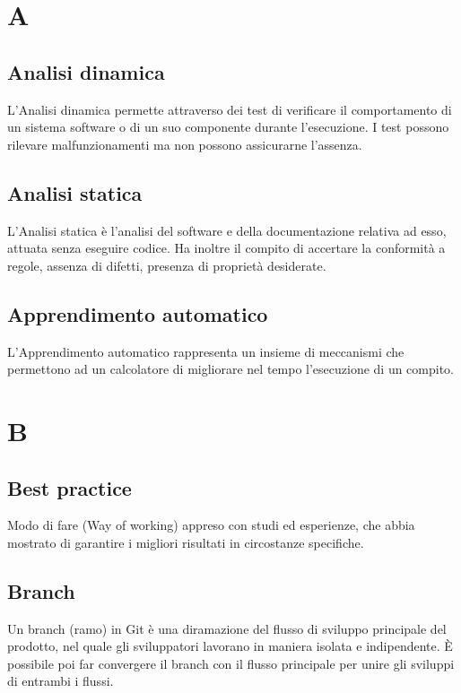 	\section{A}
	\subsection{Analisi dinamica} 
	L'Analisi dinamica permette attraverso dei test di verificare il comportamento di un sistema software o di un suo componente durante l'esecuzione. I test possono rilevare malfunzionamenti ma non possono assicurarne l'assenza.
	
	\subsection{Analisi statica}
	L'Analisi statica è l'analisi del software e della documentazione relativa ad esso, attuata senza eseguire codice. Ha inoltre il compito di accertare la conformità a regole, assenza di difetti, presenza di proprietà desiderate.
	
	\subsection{Apprendimento automatico}
	L'Apprendimento automatico rappresenta un insieme di meccanismi che permettono ad un calcolatore di migliorare nel tempo l'esecuzione di un compito. 
	
	\section{B}
	\subsection{Best practice} 
	Modo di fare (Way of working) appreso con studi ed esperienze, che abbia mostrato di garantire i migliori risultati in circostanze specifiche.
	
	\subsection{Branch} 
	Un branch (ramo) in Git è una diramazione del flusso di sviluppo principale del prodotto, nel quale gli sviluppatori lavorano in maniera isolata e indipendente. \`E possibile poi far convergere il branch con il flusso principale per unire gli sviluppi di entrambi i flussi.
	
